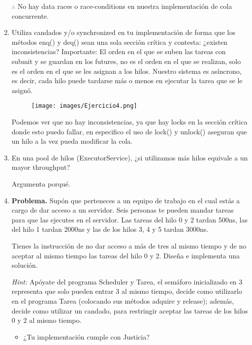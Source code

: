 \begin{enumerate}
$\therefore$ No hay data races o race-conditions en nuestra implementación de cola concurrente.

\hfill

\item  Utiliza candados y/o synchronized en tu implementación de forma que los métodos enq() y deq() sean una sola sección crítica y contesta: ¿existen inconsistencias?
Importante: El orden en el que se suben las tareas con submit y se guardan en los futures, no es el orden en el que se realizan, solo es el orden en el que se les asignan a los hilos. Nuestro sistema es asíncrono, es decir, cada hilo puede tardarse más o menos en ejecutar la tarea que se le asignó.

\begin{figure}[h]
    \centering
    \texttt{[image: images/Ejercicio4.png]}
\end{figure}

Podemos ver que no hay inconsistencias, ya que hay locks en la sección crítica donde esto puedo fallar, en especifico el uso de lock()  y unlock() aseguran que un hilo a la vez pueda modificar la cola.
\hfill

\hfill

\item En una pool de hilos (ExecutorService), ¿si utilizamos más hilos equivale a un mayor throughput?

Argumenta porqué.

\hfill

\item \textbf{Problema.} Supón que perteneces a un equipo de trabajo en el cual estás a cargo de dar acceso a un servidor. Seis personas te pueden mandar tareas para que las ejecutes en el servidor. Las tareas del hilo 0 y 2 tardan 500ns, las del hilo 1 tardan 2000ns y las de los hilos 3, 4 y 5 tardan 3000ns.

Tienes la instrucción de no dar acceso a más de tres al mismo tiempo y de no aceptar al mismo tiempo las tareas del hilo 0 y 2. Diseña e implementa una solución. 

\textit{Hint:} Apóyate del programa Scheduler y Tarea, el semáforo inicializado en 3 representa que solo pueden entrar 3 al mismo tiempo, decide como utilizarlo en el programa Tarea (colocando sus métodos adquire y release); además, decide como utilizar un candado, para restringir aceptar las tareas de los hilos 0 y 2 al mismo tiempo.

\begin{itemize}
    \item ¿Tu implementación cumple con Justicia?


\end{itemize}
\end{enumerate}
